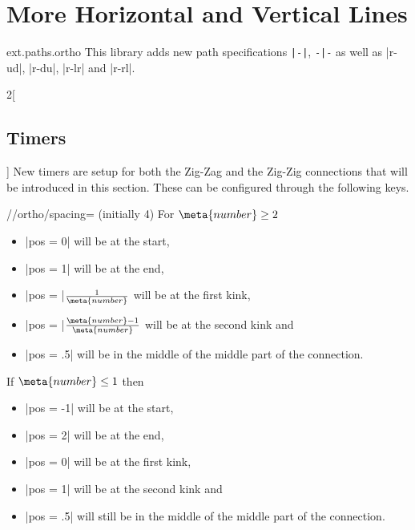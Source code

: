%
%
%

\section{More Horizontal and Vertical Lines}
\label{library:paths.ortho}

\begin{tikzlibrary}{ext.paths.ortho}
  This library adds new path specifications \verb!|-|!, \verb!-|-!
  as well as |r-ud|, |r-du|, |r-lr| and |r-rl|.
\end{tikzlibrary}

\begin{multicols*}{2}[\subsection{Timers}]
New timers are setup for both the Zig-Zag and the Zig-Zig connections
that will be introduced in this section.
These can be configured through the following keys.
\begin{key}{/\tikzext/ortho/spacing= (initially 4)}
  For $\meta{number} \geq 2$
  \begin{itemize}
  \item |pos = 0| will be at the start,
  \item |pos = 1| will be at the end,
  \item |pos = |$\frac{1}{\meta{number}}$ will be at the first kink,
  \item |pos = |$\frac{\meta{number}-1}{\meta{number}}$ will be at the second kink and
  \item |pos = .5| will be in the middle of the middle part of the connection.
  \end{itemize}
  
  If $\meta{number} \leq 1$ then
  \begin{itemize}
  \item |pos = -1| will be at the start,
  \item |pos = 2| will be at the end,
  \item |pos = 0| will be at the first kink,
  \item |pos = 1| will be at the second kink and
  \item |pos = .5| will still be in the middle of the middle part of the connection.
  \end{itemize}
\end{key}


\end{multicols*}
